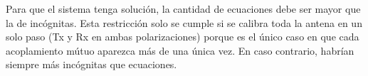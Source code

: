 Para que el sistema tenga solución, la cantidad de ecuaciones debe ser mayor que la de incógnitas. Esta restricción solo 
se cumple si se calibra toda la antena en un solo paso (Tx y Rx en ambas polarizaciones) porque es el único caso en que 
cada acoplamiento mútuo aparezca más de una única vez. En caso contrario, habrían siempre más incógnitas que ecuaciones.


\begin{comment}

Una vez definido el modelo matemático que se pretende emular y el soporte físico sobre el cuál ejecutarlo, se procede a la aplicación del instrumento
que permitirá enlazar las dos partes del proyecto: el control.

Los sistemas de control constituyen una herramienta muy poderosa para la resolución de problemas en ingeniería. Las técnicas que proporciona son de
esencial importancia para el diseño de sistemas complejos. En electrónica, la aplicación de los recursos que proporciona el control automático son
ampliamente utilizados y cada vez encuentran más aplicaciones y de mejor desempeño, gracias al avance de los sistemas embebidos en los últimos tiempos.

Los sistemas digitales modernos han ofrecido un soporte muy robusto a la teoría de control, posibilitando la implementación de funciones y técnicas
que de otro modo serían impracticables. El uso de las herramientas de control mediante sistemas embebidos tiene la gran ventaja, frente a 
mecanismos analógicos, de ser realizados por medio de la programación de los algoritmos que definen la operación a efectuar, de modo que permiten
gran libertad y rigidez al diseño.

Los equipos de potencia electrónicos tienen grandes exigencias temporales para la operación que realizan, tal es el caso de los convertidores conmutados
que requieren de una razonable velocidad de conmutación de las llaves electrónicas que los componen. Es por ello que la electrónica de potencia recibe una
ayuda indispensable del control de sistemas discretos.

El \emph{hardware} utilizado consiste en un DSP que posee varios módulos, de los cuales varios han sido utilizados tanto para hacer cálculos, relevar
mediciones o entregar señales de control. La programación ha sido realizada progresivamente por medio de dos entornos de programación, uno de nivel más
alto y otro de más bajo nivel que contiene el compilador del código que es programado directamente en el dispositivo.


\end{comment}
